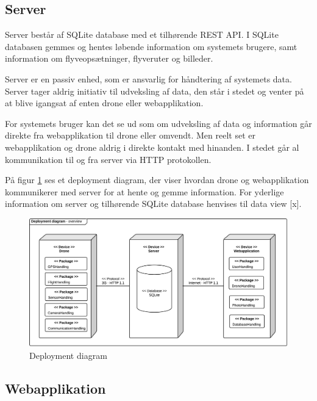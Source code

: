 \newpage 

\subsection{Server}

Server består af SQLite database med et tilhørende REST API. I SQLite databasen gemmes og hentes løbende information om systemets brugere, samt information om flyveopsætninger, flyveruter og billeder.  

Server er en passiv enhed, som er ansvarlig for håndtering af systemets data. Server tager aldrig initiativ til udveksling af data, den står i stedet og venter på at blive igangsat af enten drone eller webapplikation.

For systemets bruger kan det se ud som om udveksling af data og information går direkte fra webapplikation til drone eller omvendt. Men reelt set er webapplikation og drone aldrig i direkte kontakt med hinanden. I stedet går al kommunikation til og fra server via HTTP protokollen. 

På figur \ref{fig:deployment_diagram} ses et deployment diagram, der viser hvordan drone og webapplikation kommunikerer med server for at hente og gemme information. For yderlige information om server og tilhørende SQLite database henvises til data view [x].

\begin{figure}[H]
\centering
\includegraphics[width=1\textwidth]{Billeder/deployment_overview.png}
\vspace{-0.5cm}
\caption{Deployment diagram}
\label{fig:deployment_diagram}
\end{figure}
 
\newpage


\subsection{Webapplikation}

